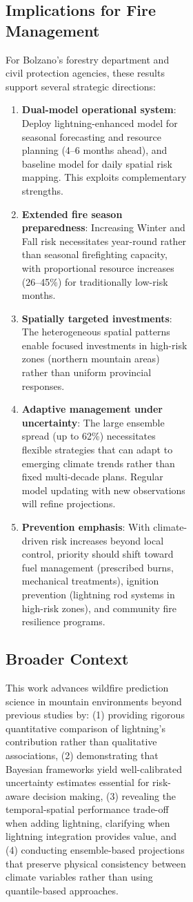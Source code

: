 \documentclass[11pt,a4paper]{article}
\begin{document}
\begin{figure}[H]
\begin{figure}[H]
\begin{figure}[H]
\subsection{Implications for Fire Management}

For Bolzano's forestry department and civil protection agencies, these results support several strategic directions:

\begin{enumerate}
    \item \textbf{Dual-model operational system}: Deploy lightning-enhanced model for seasonal forecasting and resource planning (4--6 months ahead), and baseline model for daily spatial risk mapping. This exploits complementary strengths.
    \item \textbf{Extended fire season preparedness}: Increasing Winter and Fall risk necessitates year-round rather than seasonal firefighting capacity, with proportional resource increases (26--45\%) for traditionally low-risk months.
    \item \textbf{Spatially targeted investments}: The heterogeneous spatial patterns enable focused investments in high-risk zones (northern mountain areas) rather than uniform provincial responses.
    \item \textbf{Adaptive management under uncertainty}: The large ensemble spread (up to 62\%) necessitates flexible strategies that can adapt to emerging climate trends rather than fixed multi-decade plans. Regular model updating with new observations will refine projections.
    \item \textbf{Prevention emphasis}: With climate-driven risk increases beyond local control, priority should shift toward fuel management (prescribed burns, mechanical treatments), ignition prevention (lightning rod systems in high-risk zones), and community fire resilience programs.
\end{enumerate}

\subsection{Broader Context}

This work advances wildfire prediction science in mountain environments beyond previous studies by: (1) providing rigorous quantitative comparison of lightning's contribution rather than qualitative associations, (2) demonstrating that Bayesian frameworks yield well-calibrated uncertainty estimates essential for risk-aware decision making, (3) revealing the temporal-spatial performance trade-off when adding lightning, clarifying when lightning integration provides value, and (4) conducting ensemble-based projections that preserve physical consistency between climate variables rather than using quantile-based approaches.


\end{figure}
\end{figure}
\end{figure}
\end{document}
